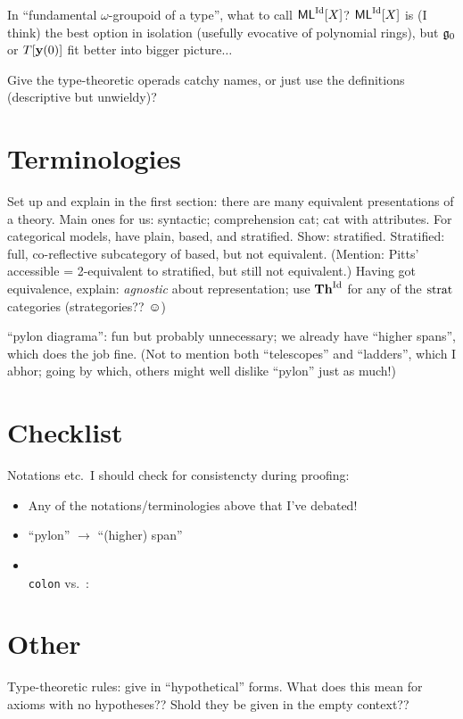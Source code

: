 \documentclass{amsart}
\begin{document}
\para In ``fundamental $\omega$-groupoid of a type'', what to call $\mathsf{ML}^{\mathrm{Id}}[X]$?  $\mathsf{ML}^{\mathrm{Id}}[X]$ is (I think) the best option in isolation (usefully evocative of polynomial rings), but $\mathfrak{g}_{0}$ or $\\T[\mathbf{y}(0)]$ fit better into bigger picture$\ldots$

\para Give the type-theoretic operads catchy names, or just use the definitions (descriptive but unwieldy)?

\section{Terminologies}

\para Set up and explain in the first section: there are many equivalent presentations of a theory.  Main ones for us: syntactic; comprehension cat; cat with attributes.  For categorical models, have plain, based, and stratified.  Show: stratified.  Stratified: full, co-reflective subcategory of based, but not equivalent.  (Mention: Pitts' accessible = 2-equivalent to stratified, but still not equivalent.)  Having got equivalence, explain: \emph{agnostic} about representation; use $\mathbf{Th}^{\mathrm{Id}}$ for any of the $\textrm{strat}$ categories (strategories?? $\smiley$)

\para ``pylon diagrama'': fun but probably unnecessary; we already have ``higher spans'', which does the job fine. (Not to mention both ``telescopes'' and ``ladders'', which I abhor; going by which, others might well dislike ``pylon'' just as much!)

\section{Checklist}  Notations etc.\ I should check for consistencty during proofing:
\begin{itemize}
\item Any of the notations/terminologies above that I've debated!
\item ``pylon'' $\longrightarrow$ ``(higher) span''
\item \texttt{\\colon} vs.\ :
\end{itemize}

\section{Other}

\para Type-theoretic rules: give in ``hypothetical'' forms.  What does this mean for axioms with no hypotheses??  Shold they be given in the empty context?? 
\end{document}
